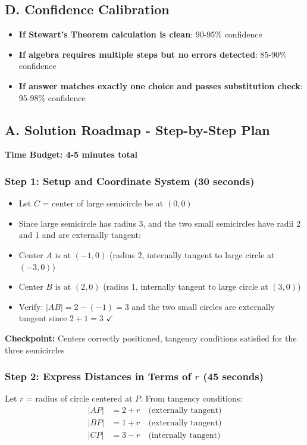 \documentclass[]{article}
\begin{document}
\begin{verificationbox}
\subsection*{D. Confidence Calibration}
\begin{itemize}[leftmargin=*]
    \item \textbf{If Stewart's Theorem calculation is clean}: 90-95\% confidence
    \item \textbf{If algebra requires multiple steps but no errors detected}: 85-90\% confidence
    \item \textbf{If answer matches exactly one choice and passes substitution check}: 95-98\% confidence
\end{itemize}
\end{verificationbox}

\begin{solutionbox}
\subsection*{A. Solution Roadmap - Step-by-Step Plan}

\textbf{Time Budget: 4-5 minutes total}

\subsubsection*{Step 1: Setup and Coordinate System (30 seconds)}
\begin{itemize}[leftmargin=*]
    \item Let $C$ = center of large semicircle be at $(0, 0)$
    \item Since large semicircle has radius 3, and the two small semicircles have radii 2 and 1 and are externally tangent:
    \item Center $A$ is at $(-1, 0)$ (radius 2, internally tangent to large circle at $(-3, 0)$)
    \item Center $B$ is at $(2, 0)$ (radius 1, internally tangent to large circle at $(3, 0)$)
    \item Verify: $|AB| = 2 - (-1) = 3$ and the two small circles are externally tangent since $2 + 1 = 3$ $\checkmark$
\end{itemize}

\textbf{Checkpoint:} Centers correctly positioned, tangency conditions satisfied for the three semicircles

\subsubsection*{Step 2: Express Distances in Terms of $r$ (45 seconds)}
Let $r$ = radius of circle centered at $P$. From tangency conditions:
\begin{align*}
|AP| &= 2 + r \quad \text{(externally tangent)}\\
|BP| &= 1 + r \quad \text{(externally tangent)}\\
|CP| &= 3 - r \quad \text{(internally tangent)}
\end{align*}


\end{solutionbox}
\end{document}

